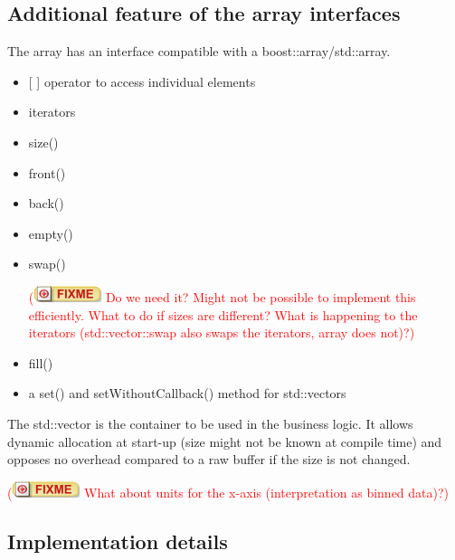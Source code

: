\documentclass[11pt,a4paper]{scrartcl}
\newcounter{nFixmes}
\newcommand{\fixme}[1]{\addtocounter{nFixmes}{1}\textcolor{red}{(\includegraphics[height=2ex]{fixme} #1)}\xspace}
\begin{document}
\subsection{Additional feature of the array interfaces}
The array has an interface compatible with a boost::array/std::array.
\begin{itemize}
\item {[ ]} operator to access individual elements
\item iterators
\item size()
\item front()
\item back()
\item empty()
\item swap() \fixme{Do we need it? Might not be possible to implement this efficiently. What to do if sizes are different? What is happening to the iterators (std::vector::swap also swaps the iterators, array does not)?}
\item fill()
\item a set() and setWithoutCallback() method for std::vectors
\end{itemize}
The std::vector is the container to be used in the business logic. It allows dynamic allocation at
start-up (size might not be known at compile time) and opposes no overhead compared to
a raw buffer if the size is not changed.

\fixme{What about units for the x-axis (interpretation as binned data)?}

\subsection{Implementation details}
\end{document}
